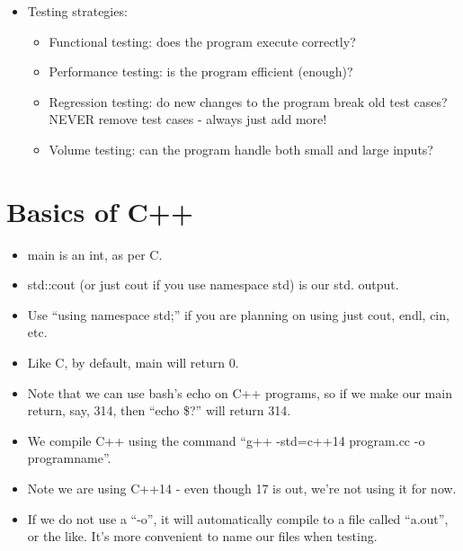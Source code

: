 \documentclass{article}
\begin{document}
\begin{itemize}
\begin{itemize}
\end{itemize}

    
\item Testing strategies:
\begin{itemize}
\item Functional testing: does the program execute correctly?
\item Performance testing: is the program efficient (enough)?
\item Regression testing: do new changes to the program break old test cases?  NEVER remove test cases - always just add more!
\item Volume testing: can the program handle both small and large inputs?
\end{itemize}

\end{itemize}


\section{Basics of C++}
\begin{itemize}
\item main is an int, as per C.
\item std::cout (or just cout if you use namespace std) is our std. output.
\item Use ``using namespace std;'' if you are planning on using just cout, endl, cin, etc.
\item Like C, by default, main will return 0.
\item Note that we can use bash's echo on C++ programs, so if we make our main return, say, 314, then ``echo \$?'' will return 314.
\item We compile C++ using the command ``g++ -std=c++14 program.cc -o programname''.
\item Note we are using C++14 - even though 17 is out, we're not using it for now.
\item If we do not use a ``-o'', it will automatically compile to a file called ``a.out'', or the like.  It's more convenient to name our files when testing.
\end{itemize}
\end{document}
